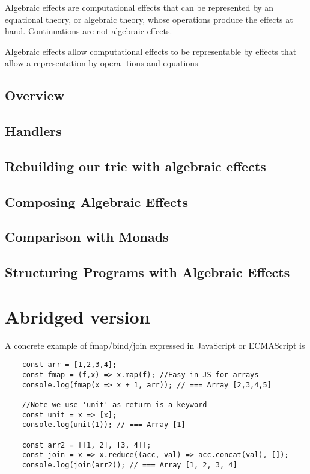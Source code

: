 \documentclass[a4paper,10pt]{article}
\theoremstyle{definition}
\begin{document}

Algebraic effects are computational effects that can be represented by an equational theory, or algebraic theory, whose operations produce the effects at hand.
Continuations are not algebraic effects.

Algebraic effects allow computational effects to be representable by
effects that allow a representation by opera- tions and equations

\subsection{Overview}
\subsection{Handlers}
\subsection{Rebuilding our trie with algebraic effects}
\subsection{Composing Algebraic Effects}
\subsection{Comparison with Monads}
\subsection{Structuring Programs with Algebraic Effects}

\pagebreak
\section{Abridged version}

A concrete example of fmap/bind/join expressed in JavaScript or ECMAScript is
\begin{verbatim}
    const arr = [1,2,3,4];
    const fmap = (f,x) => x.map(f); //Easy in JS for arrays
    console.log(fmap(x => x + 1, arr)); // === Array [2,3,4,5]

    //Note we use 'unit' as return is a keyword
    const unit = x => [x];
    console.log(unit(1)); // === Array [1]

    const arr2 = [[1, 2], [3, 4]];
    const join = x => x.reduce((acc, val) => acc.concat(val), []);
    console.log(join(arr2)); // === Array [1, 2, 3, 4]
\end{verbatim}
\end{document}
